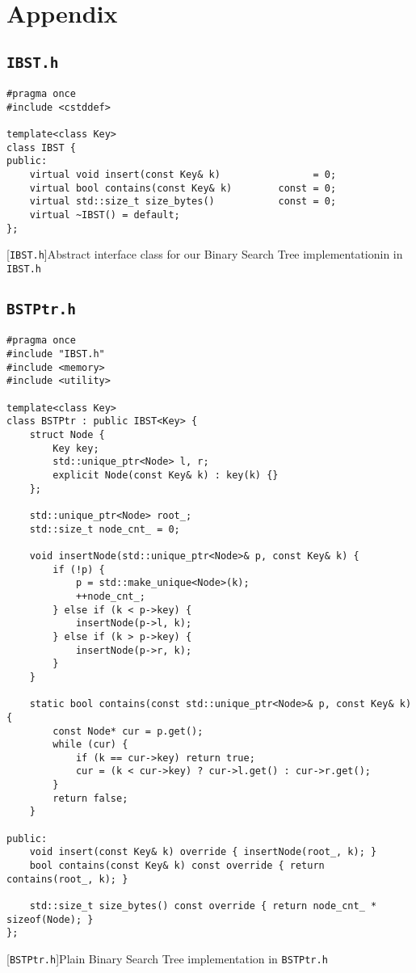 \newpage
\section{Appendix}
\label{sec:app}
\subsection{\texttt{IBST.h}}
\begin{lstlisting}
#pragma once
#include <cstddef>

template<class Key>
class IBST {
public:
    virtual void insert(const Key& k)                = 0;
    virtual bool contains(const Key& k)        const = 0;
    virtual std::size_t size_bytes()           const = 0;
    virtual ~IBST() = default;
};
\end{lstlisting}
[\texttt{IBST.h}]{Abstract interface class for our Binary Search Tree implementationin in \texttt{IBST.h}}
\label{lst:ibst}

\subsection{\texttt{BSTPtr.h}}
\begin{lstlisting}
#pragma once
#include "IBST.h"
#include <memory>
#include <utility>

template<class Key>
class BSTPtr : public IBST<Key> {
    struct Node {
        Key key;
        std::unique_ptr<Node> l, r;
        explicit Node(const Key& k) : key(k) {}
    };

    std::unique_ptr<Node> root_;
    std::size_t node_cnt_ = 0;

    void insertNode(std::unique_ptr<Node>& p, const Key& k) {
        if (!p) {
            p = std::make_unique<Node>(k);
            ++node_cnt_;                         
        } else if (k < p->key) {
            insertNode(p->l, k);
        } else if (k > p->key) {
            insertNode(p->r, k);
        }
    }

    static bool contains(const std::unique_ptr<Node>& p, const Key& k) {
        const Node* cur = p.get();
        while (cur) {
            if (k == cur->key) return true;
            cur = (k < cur->key) ? cur->l.get() : cur->r.get();
        }
        return false;
    }

public:
    void insert(const Key& k) override { insertNode(root_, k); }
    bool contains(const Key& k) const override { return contains(root_, k); }

    std::size_t size_bytes() const override { return node_cnt_ * sizeof(Node); }
};
\end{lstlisting}
[\texttt{BSTPtr.h}]{Plain Binary Search Tree implementation in \texttt{BSTPtr.h}}
\label{lst:btspointer}


